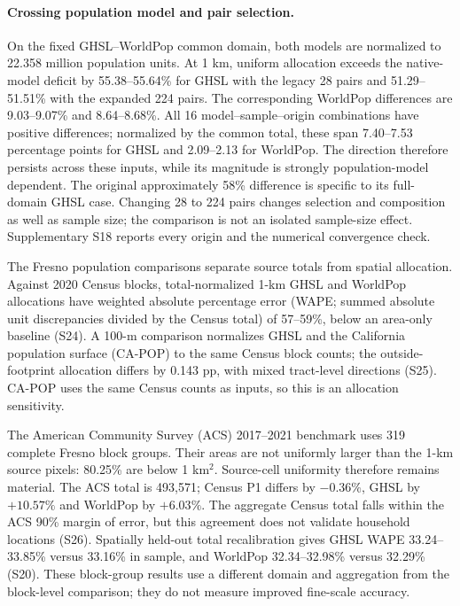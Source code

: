\documentclass[pdflatex,sn-nature]{sn-jnl}
\begin{document}
\paragraph{Crossing population model and pair selection.} On the fixed GHSL--WorldPop common domain, both models are normalized to 22.358 million population units. At 1 km, uniform allocation exceeds the native-model deficit by 55.38--55.64\% for GHSL with the legacy 28 pairs and 51.29--51.51\% with the expanded 224 pairs. The corresponding WorldPop differences are 9.03--9.07\% and 8.64--8.68\%. All 16 model--sample--origin combinations have positive differences; normalized by the common total, these span 7.40--7.53 percentage points for GHSL and 2.09--2.13 for WorldPop. The direction therefore persists across these inputs, while its magnitude is strongly population-model dependent. The original approximately 58\% difference is specific to its full-domain GHSL case. Changing 28 to 224 pairs changes selection and composition as well as sample size; the comparison is not an isolated sample-size effect. Supplementary S18 reports every origin and the numerical convergence check.


The Fresno population comparisons separate source totals from spatial allocation. Against 2020 Census blocks, total-normalized 1-km GHSL and WorldPop allocations have weighted absolute percentage error (WAPE; summed absolute unit discrepancies divided by the Census total) of 57--59\%, below an area-only baseline (S24). A 100-m comparison normalizes GHSL and the California population surface (CA-POP) to the same Census block counts; the outside-footprint allocation differs by 0.143 pp, with mixed tract-level directions (S25). CA-POP uses the same Census counts as inputs, so this is an allocation sensitivity.

The American Community Survey (ACS) 2017--2021 benchmark uses 319 complete Fresno block groups. Their areas are not uniformly larger than the 1-km source pixels: 80.25\% are below 1 km$^2$. Source-cell uniformity therefore remains material. The ACS total is 493,571; Census P1 differs by $-0.36\%$, GHSL by $+10.57\%$ and WorldPop by $+6.03\%$. The aggregate Census total falls within the ACS 90\% margin of error, but this agreement does not validate household locations (S26). Spatially held-out total recalibration gives GHSL WAPE 33.24--33.85\% versus 33.16\% in sample, and WorldPop 32.34--32.98\% versus 32.29\% (S20). These block-group results use a different domain and aggregation from the block-level comparison; they do not measure improved fine-scale accuracy.
\end{document}
